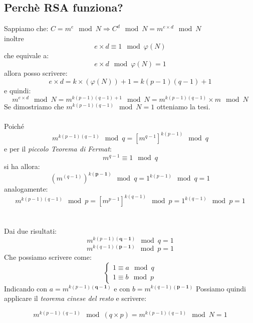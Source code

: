 \documentclass[10pt,a4paper]{article}
\begin{document}
\subsection{Perchè RSA funziona?}
Sappiamo che:
$ \boxed{C=m^e \mod N} \Rightarrow C^d \mod N=m^{e\times d} \mod N$\\ inoltre  \[\boxed{ e\times d \equiv1 \mod \varphi(N)} \] che equivale a:\[ e\times d \mod \varphi(N) =1 \]
allora posso scrivere: \[ e\times d=k\times (\varphi(N))+1=k(p-1)(q-1)+1 \] e quindi:
\[ m^{e\times d} \mod N=m^{k(p-1)(q-1)+1} 	\mod N=m^{k(p-1)(q-1)}\times m 	\mod N \]
Se dimostriamo che $\boxed{ m^{k(p-1)(q-1)} 	\mod N=1 }$ otteniamo la tesi. 
\\\\
Poiché \[m^{k(p-1)(q-1)} 	\mod q=[m^{q-1}]^{k(p-1)} 	\mod q  \]
e per il \textit{piccolo Teorema di Fermat}: \[\boxed{ m^{q-1} \equiv 1 \mod q} \]
si ha allora: \[ (m^{(q-1)})^{k\mathbf{(p-1)}} 	\mod q=1^{k(p-1)} 	\mod q=1 \] analogamente:
\[m^{k(p-1)(q-1)} 	\mod p=[m^{p-1}]^{k(q-1)} 	\mod p=1^{k(q-1)} \mod p=1  \]
 \\\\
 Dai due risultati: 
  \[m^{k(p-1)\mathbf{(q-1)}} 	\mod q=1\]  \[  m^{k(q-1)\mathbf{(p-1)}} 	\mod p=1  \]
  Che possiamo scrivere come:
  \[ \left\{
     \begin{array}{rl}
     1\equiv a \mod q\\
     1\equiv b \mod p
     \end{array}
     \right.   \]
     Indicando con $\boxed{a=m^{k(p-1)\mathbf{(q-1)}} } $ e con $ \boxed{b=m^{k(q-1)\mathbf{(p-1)}}} $
 Possiamo quindi applicare  il \textit{teorema cinese del resto}  e   scrivere:
 
 \[ m^{k(p-1)(q-1)} 	\mod (q\times p)= m^{k(p-1)(q-1)} 	\mod N=1 \]  
\end{document}
